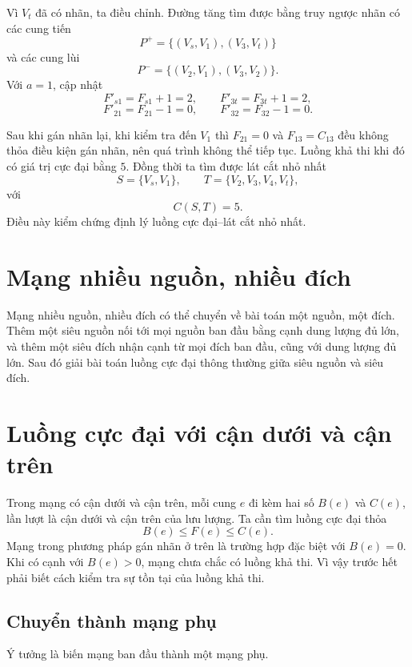 \documentclass[11pt]{article}
\begin{document}
Vì $V_t$ đã có nhãn, ta điều chỉnh. Đường tăng tìm được bằng truy ngược nhãn
có các cung tiến
\[
  P^+=\{(V_s,V_1),(V_3,V_t)\}
\]
và các cung lùi
\[
  P^-=\{(V_2,V_1),(V_3,V_2)\}.
\]
Với $a=1$, cập nhật
\[
  F'_{s1}=F_{s1}+1=2,\qquad F'_{3t}=F_{3t}+1=2,
\]
\[
  F'_{21}=F_{21}-1=0,\qquad F'_{32}=F_{32}-1=0.
\]

Sau khi gán nhãn lại, khi kiểm tra đến $V_1$ thì $F_{21}=0$ và
$F_{13}=C_{13}$ đều không thỏa điều kiện gán nhãn, nên quá trình không thể
tiếp tục. Luồng khả thi khi đó có giá trị cực đại bằng $5$. Đồng thời ta tìm
được lát cắt nhỏ nhất
\[
  S=\{V_s,V_1\},\qquad T=\{V_2,V_3,V_4,V_t\},
\]
với
\[
  C(S,T)=5.
\]
Điều này kiểm chứng định lý luồng cực đại--lát cắt nhỏ nhất.

\section{Mạng nhiều nguồn, nhiều đích}

Mạng nhiều nguồn, nhiều đích có thể chuyển về bài toán một nguồn, một đích.
Thêm một siêu nguồn nối tới mọi nguồn ban đầu bằng cạnh dung lượng đủ lớn, và
thêm một siêu đích nhận cạnh từ mọi đích ban đầu, cũng với dung lượng đủ lớn.
Sau đó giải bài toán luồng cực đại thông thường giữa siêu nguồn và siêu đích.

\section{Luồng cực đại với cận dưới và cận trên}

Trong mạng có cận dưới và cận trên, mỗi cung $e$ đi kèm hai số $B(e)$ và
$C(e)$, lần lượt là cận dưới và cận trên của lưu lượng. Ta cần tìm luồng cực
đại thỏa
\[
  B(e)\le F(e)\le C(e).
\]
Mạng trong phương pháp gán nhãn ở trên là trường hợp đặc biệt với $B(e)=0$.
Khi có cạnh với $B(e)>0$, mạng chưa chắc có luồng khả thi. Vì vậy trước hết
phải biết cách kiểm tra sự tồn tại của luồng khả thi.

\subsection{Chuyển thành mạng phụ}

Ý tưởng là biến mạng ban đầu thành một mạng phụ.
\end{document}
